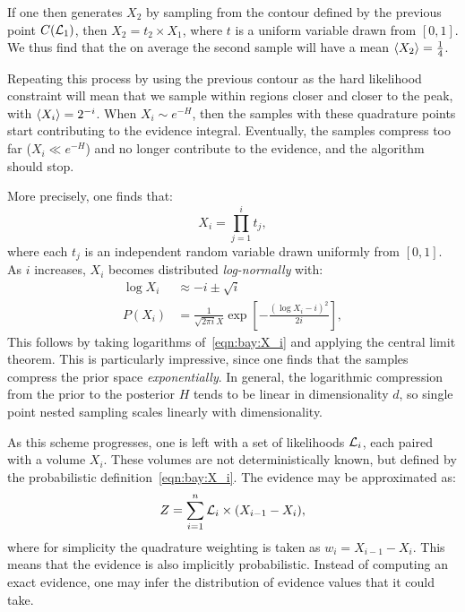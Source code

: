 If one then generates $X_2$ by sampling from the contour defined by the previous point $C(\mathcal{L}_1)$, then $X_2=t_2\times X_1$, where $t$ is a uniform variable drawn from $[0,1]$. We thus find that the on average the second sample will have a mean ${\left\langle{X_2}\right\rangle} = \frac{1}{4}$. 

Repeating this process by using the previous contour as the hard likelihood constraint will mean that we sample within regions closer and closer to the peak, with ${\left\langle{X_i}\right\rangle} = 2^{-i}$. When $X_i\sim e^{-H}$, then the samples with these quadrature points start contributing to the evidence integral. Eventually, the samples compress too far ($X_i\ll e^{-H}$) and no longer contribute to the evidence, and the algorithm should stop.

More precisely, one finds that:
\begin{equation}
  X_i = \prod_{j=1}^i t_j,
  \label{eqn:bay:X_i}
\end{equation}
where each $t_j$ is an independent random variable drawn uniformly from $[0,1]$. As $i$ increases, $X_i$ becomes distributed {\em log-normally\/} with:
\begin{align}
  \log X_i  &\approx -i \pm \sqrt{i}
  \label{eqn:bay:log_normal_1_1}
  \\
  P(X_i) &= \frac{1}{\sqrt{2\pi i} X}\exp\left[ -\frac{{\left( \log X_i - i \right)}^2}{2 i}  \right],
  \label{eqn:bay:log_normal_1_2}
\end{align}
This follows by taking logarithms of~\eqref{eqn:bay:X_i} and applying the central limit theorem. This is particularly impressive, since one finds that the samples compress the prior space {\em exponentially}. In general, the logarithmic compression from the prior to the posterior $H$ tends to be linear in dimensionality $d$, so single point nested sampling scales linearly with dimensionality.

As this scheme progresses, one is left with a set of likelihoods $\mathcal{L}_i$, each paired with a volume $X_i$. These volumes are not deterministically known, but defined by the probabilistic definition~\eqref{eqn:bay:X_i}. The evidence may be approximated as:
\begin{equation}
  Z = \sum_{i=1}^n \mathcal{L}_i \times (X_{i-1}-X_{i}),
  \label{eqn:bay:ev_sum}
\end{equation}
where for simplicity the quadrature weighting is taken as $w_i = X_{i-1}-X_i$. This means that the evidence is also implicitly probabilistic. Instead of computing an exact evidence, one may infer the distribution of evidence values that it could take.

